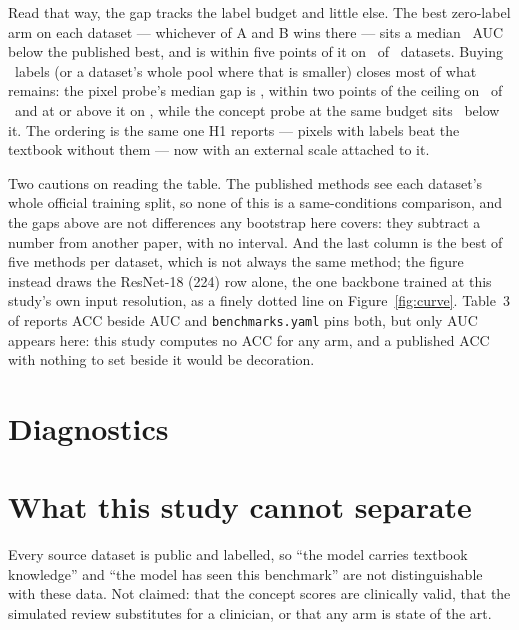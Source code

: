 \documentclass[11pt]{article}
\begin{document}
Read that way, the gap tracks the label budget and little else. The best zero-label arm on each
dataset --- whichever of A and B wins there --- sits a median \litGapZeroMedian\ AUC below the
published best, and is within five points of it on \litZeroWithinFivePoints\ of \numArmBDatasets\
datasets. Buying \litLargestN\ labels (or a dataset's whole pool where that is smaller) closes most
of what remains: the pixel probe's median gap is
\litGapPixelMedian, within two points of the ceiling on \litPixelWithinTwoPoints\ of \numDatasets\
and at or above it on \litPixelAtOrAboveCeiling, while the concept probe at the same budget sits
\litGapConceptMedian\ below it. The ordering is the
same one H1 reports --- pixels with labels beat the textbook without them --- now with an external
scale attached to it.

Two cautions on reading the table. The published methods see each dataset's whole official training
split, so none of this is a same-conditions comparison, and the gaps above are not differences any
bootstrap here covers: they subtract a number from another paper, with no interval. And the last
column is the best of five methods per dataset, which is not always the same method; the figure
instead draws the ResNet-18 (224) row alone, the one backbone trained at this study's own input
resolution, as a finely dotted line on Figure~\ref{fig:curve}. Table~3 of \cite{yang2023} reports
ACC beside AUC and \texttt{benchmarks.yaml} pins both, but only AUC appears here: this study
computes no ACC for any arm, and a published ACC with nothing to set beside it would be decoration.



\section{Diagnostics}





\section{What this study cannot separate}

Every source dataset is public and labelled, so ``the model carries textbook knowledge'' and ``the
model has seen this benchmark'' are not distinguishable with these data. Not claimed: that the
concept scores are clinically valid, that the simulated review substitutes for a clinician, or that
any arm is state of the art.
\end{document}
